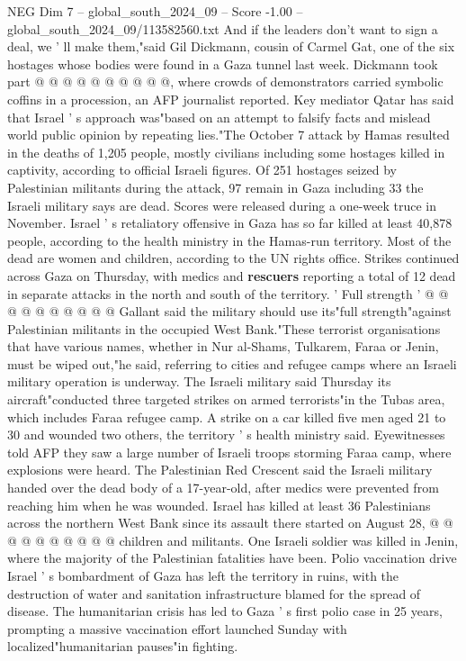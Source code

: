\begin{textsample}{NEG Dim 7 – global\_south\_2024\_09 – Score -1.00 – global\_south\_2024\_09/113582560.txt}
And if the leaders don't want to sign a deal, we ' ll make them,"said Gil Dickmann, cousin of Carmel Gat, one of the six hostages whose bodies were found in a Gaza tunnel last week.
Dickmann took part @ @ @ @ @ @ @ @ @ @, where crowds of demonstrators carried symbolic coffins in a procession, an AFP journalist reported.
Key mediator Qatar has said that Israel ' s approach was"based on an attempt to falsify facts and mislead world public opinion by repeating lies."The October 7 attack by Hamas resulted in the deaths of 1,205 people, mostly civilians including some hostages killed in captivity, according to official Israeli figures.
Of 251 hostages seized by Palestinian militants during the attack, 97 remain in Gaza including 33 the Israeli military says are dead.
Scores were released during a one-week truce in November.
Israel ' s retaliatory offensive in Gaza has so far killed at least 40,878 people, according to the health ministry in the Hamas-run territory.
Most of the dead are women and children, according to the UN rights office.
Strikes continued across Gaza on Thursday, with medics and \textbf{rescuers} reporting a total of 12 dead in separate attacks in the north and south of the territory. ' Full strength ' @ @ @ @ @ @ @ @ @ @ Gallant said the military should use its"full strength"against Palestinian militants in the occupied West Bank."These terrorist organisations that have various names, whether in Nur al-Shams, Tulkarem, Faraa or Jenin, must be wiped out,"he said, referring to cities and refugee camps where an Israeli military operation is underway.
The Israeli military said Thursday its aircraft"conducted three targeted strikes on armed terrorists"in the Tubas area, which includes Faraa refugee camp.
A strike on a car killed five men aged 21 to 30 and wounded two others, the territory ' s health ministry said.
Eyewitnesses told AFP they saw a large number of Israeli troops storming Faraa camp, where explosions were heard.
The Palestinian Red Crescent said the Israeli military handed over the dead body of a 17-year-old, after medics were prevented from reaching him when he was wounded.
Israel has killed at least 36 Palestinians across the northern West Bank since its assault there started on August 28, @ @ @ @ @ @ @ @ @ @ children and militants.
One Israeli soldier was killed in Jenin, where the majority of the Palestinian fatalities have been.
Polio vaccination drive Israel ' s bombardment of Gaza has left the territory in ruins, with the destruction of water and sanitation infrastructure blamed for the spread of disease.
The humanitarian crisis has led to Gaza ' s first polio case in 25 years, prompting a massive vaccination effort launched Sunday with localized"humanitarian pauses"in fighting.

\end{textsample}
